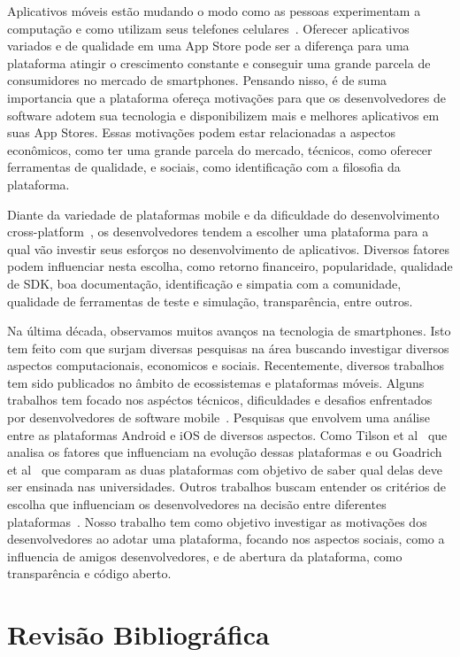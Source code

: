 \documentclass[conference]{IEEEtran}
\begin{document}
Aplicativos móveis estão mudando o modo como as pessoas experimentam a computação e como utilizam seus telefones celulares~\cite{Butler2011}. Oferecer aplicativos variados e de qualidade em uma App Store pode ser a diferença para uma plataforma atingir o crescimento constante e conseguir uma grande parcela de consumidores no mercado de smartphones. Pensando nisso, é de suma importancia que a plataforma ofereça motivações para que os desenvolvedores de software adotem sua tecnologia e disponibilizem mais e melhores aplicativos em suas App Stores. Essas motivações podem estar relacionadas a aspectos econômicos, como ter uma grande parcela do mercado, técnicos, como oferecer ferramentas de qualidade, e sociais, como identificação com a filosofia da plataforma.

Diante da variedade de plataformas mobile e da dificuldade do desenvolvimento cross-platform~\cite{Corral2012}, os desenvolvedores tendem a escolher uma plataforma para a qual vão investir seus esforços no desenvolvimento de aplicativos. Diversos fatores podem influenciar nesta escolha, como retorno financeiro, popularidade, qualidade de SDK, boa documentação, identificação e simpatia com a comunidade, qualidade de ferramentas de teste e simulação, transparência, entre outros. 

Na última década, observamos muitos avanços na tecnologia de smartphones. Isto tem feito com que surjam diversas pesquisas na área buscando investigar diversos aspectos computacionais, economicos e sociais. Recentemente, diversos trabalhos tem sido publicados no âmbito de ecossistemas e plataformas móveis. Alguns trabalhos tem focado nos aspéctos técnicos, dificuldades e desafios enfrentados por desenvolvedores de software mobile~\cite{Joorabchi2013}. Pesquisas que envolvem uma análise entre as plataformas Android e iOS de diversos aspectos. Como Tilson et al~\cite{Tilson2012} que analisa os fatores que influenciam na evolução dessas plataformas e ou Goadrich et al~\cite{Goadrich2011} que comparam as duas plataformas com objetivo de saber qual delas deve ser ensinada nas universidades. Outros trabalhos buscam entender os critérios de escolha que influenciam os desenvolvedores na decisão entre diferentes plataformas~\cite{Koch2014}. Nosso trabalho tem como objetivo investigar as motivações dos desenvolvedores ao adotar uma plataforma, focando nos aspectos sociais, como a influencia de amigos desenvolvedores, e de abertura da plataforma, como transparência e código aberto.


\section{Revisão Bibliográfica}
\end{document}
